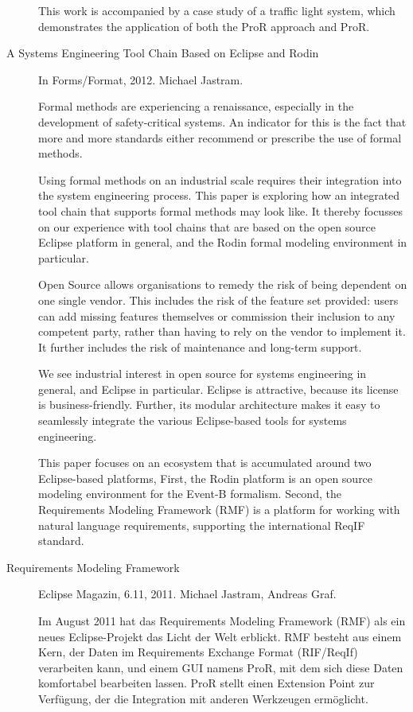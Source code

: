 \begin{description}
This work is accompanied by a case study of a traffic light system, which demonstrates the application of both the ProR approach and ProR.

\item[A Systems Engineering Tool Chain Based on Eclipse and Rodin] In Forms/Format, 2012. Michael Jastram.

Formal methods are experiencing a renaissance, especially in the development of safety-critical systems. An indicator for this is the fact that more and more standards either recommend or prescribe the use of formal methods.

Using formal methods on an industrial scale requires their integration into the system engineering process. This paper is exploring how an integrated tool chain that supports formal methods may look like. It thereby focusses on our experience with tool chains that are based on the open source Eclipse platform in general, and the Rodin formal modeling environment in particular.

Open Source allows organisations to remedy the risk of being dependent on one single vendor. This includes the risk of the feature set provided: users can add missing features themselves or commission their inclusion to any competent party, rather than having to rely on the vendor to implement it. It further includes the risk of maintenance and long-term support.

We see industrial interest in open source for systems engineering in general, and Eclipse in particular. Eclipse is attractive, because its license is business-friendly. Further, its modular architecture makes it easy to seamlessly integrate the various Eclipse-based tools for systems engineering.

This paper focuses on an ecosystem that is accumulated around two Eclipse-based platforms, First, the Rodin platform is an open source modeling environment for the Event-B formalism. Second, the Requirements Modeling Framework (RMF) is a platform for working with natural language requirements, supporting the international ReqIF standard.

\item[Requirements Modeling Framework] Eclipse Magazin, 6.11, 2011. Michael Jastram, Andreas Graf.

Im August 2011 hat das Requirements Modeling Framework (RMF) als ein neues Eclipse-Projekt das Licht der Welt erblickt. RMF besteht aus einem Kern, der Daten im Requirements Exchange Format (RIF/ReqIf) verarbeiten kann, und einem GUI namens ProR, mit dem sich diese Daten komfortabel bearbeiten lassen. ProR stellt einen Extension Point zur Verfügung, der die Integration mit anderen Werkzeugen ermöglicht. 


\end{description}
